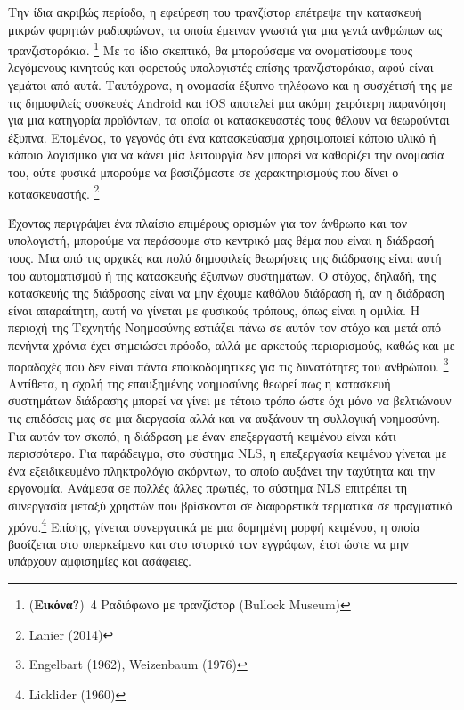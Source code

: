 \documentclass[
]{article}
\begin{document}
Την ίδια ακριβώς περίοδο, η εφεύρεση του τρανζίστορ επέτρεψε την
κατασκευή μικρών φορητών ραδιοφώνων, τα οποία έμειναν γνωστά για μια
γενιά ανθρώπων ως τρανζιστοράκια. \footnote{(\textbf{Εικόνα?})~4
  Ραδιόφωνο με τρανζίστορ (Bullock Museum)} Με το ίδιο σκεπτικό, θα
μπορούσαμε να ονοματίσουμε τους λεγόμενους κινητούς και φορετούς
υπολογιστές επίσης τρανζιστοράκια, αφού είναι γεμάτοι από αυτά.
Ταυτόχρονα, η ονομασία έξυπνο τηλέφωνο και η συσχέτισή της με τις
δημοφιλείς συσκευές Android και iOS αποτελεί μια ακόμη χειρότερη
παρανόηση για μια κατηγορία προϊόντων, τα οποία οι κατασκευαστές τους
θέλουν να θεωρούνται έξυπνα. Επομένως, το γεγονός ότι ένα κατασκεύασμα
χρησιμοποιεί κάποιο υλικό ή κάποιο λογισμικό για να κάνει μία λειτουργία
δεν μπορεί να καθορίζει την ονομασία του, ούτε φυσικά μπορούμε να
βασιζόμαστε σε χαρακτηρισμούς που δίνει ο κατασκευαστής. \footnote{Lanier
  (2014)}

Έχοντας περιγράψει ένα πλαίσιο επιμέρους ορισμών για τον άνθρωπο και τον
υπολογιστή, μπορούμε να περάσουμε στο κεντρικό μας θέμα που είναι η
διάδρασή τους. Μια από τις αρχικές και πολύ δημοφιλείς θεωρήσεις της
διάδρασης είναι αυτή του αυτοματισμού ή της κατασκευής έξυπνων
συστημάτων. Ο στόχος, δηλαδή, της κατασκευής της διάδρασης είναι να μην
έχουμε καθόλου διάδραση ή, αν η διάδραση είναι απαραίτητη, αυτή να
γίνεται με φυσικούς τρόπους, όπως είναι η ομιλία. Η περιοχή της Τεχνητής
Νοημοσύνης εστιάζει πάνω σε αυτόν τον στόχο και μετά από πενήντα χρόνια
έχει σημειώσει πρόοδο, αλλά με αρκετούς περιορισμούς, καθώς και με
παραδοχές που δεν είναι πάντα εποικοδομητικές για τις δυνατότητες του
ανθρώπου. \footnote{Engelbart (1962), Weizenbaum (1976)} Αντίθετα, η
σχολή της επαυξημένης νοημοσύνης θεωρεί πως η κατασκευή συστημάτων
διάδρασης μπορεί να γίνει με τέτοιο τρόπο ώστε όχι μόνο να βελτιώνουν
τις επιδόσεις μας σε μια διεργασία αλλά και να αυξάνουν τη συλλογική
νοημοσύνη. Για αυτόν τον σκοπό, η διάδραση με έναν επεξεργαστή κειμένου
είναι κάτι περισσότερο. Για παράδειγμα, στο σύστημα NLS, η επεξεργασία
κειμένου γίνεται με ένα εξειδικευμένο πληκτρολόγιο ακόρντων, το οποίο
αυξάνει την ταχύτητα και την εργονομία. Ανάμεσα σε πολλές άλλες πρωτιές,
το σύστημα NLS επιτρέπει τη συνεργασία μεταξύ χρηστών που βρίσκονται σε
διαφορετικά τερματικά σε πραγματικό χρόνο.\footnote{Licklider (1960)}
Επίσης, γίνεται συνεργατικά με μια δομημένη μορφή κειμένου, η οποία
βασίζεται στο υπερκείμενο και στο ιστορικό των εγγράφων, έτσι ώστε να
μην υπάρχουν αμφισημίες και ασάφειες.
\end{document}
